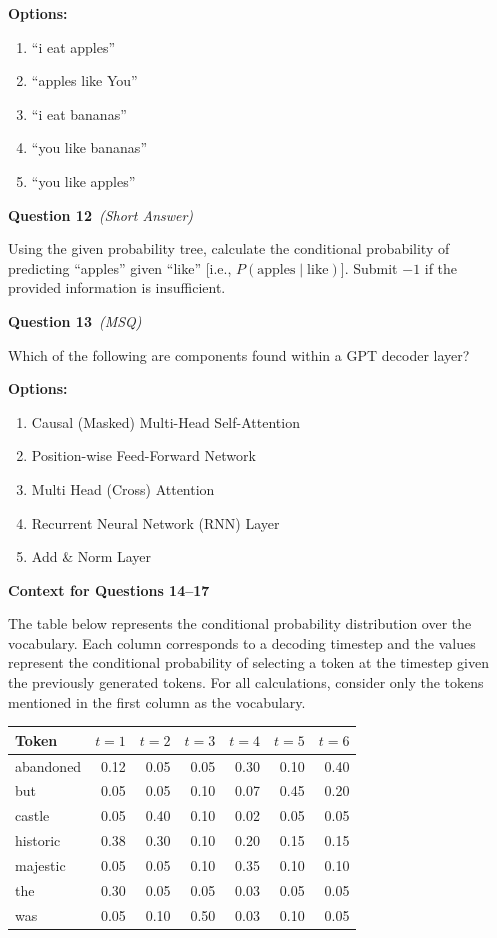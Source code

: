 \documentclass[11pt]{article}
\newcommand{\q}[2]{\vspace{0.5em}\noindent\textbf{Question #1}\if\relax\detokenize{#2}\relax\else\ \textit{(#2)}\fi\par}
\newcommand{\opts}{\textbf{Options:}}
\newcommand{\contexthead}[1]{\vspace{0.6em}\noindent\textbf{Context for Questions #1}\par}
\begin{document}
\opts
\begin{enumerate}[label=(\alph*)]
\item ``i eat apples''
\item ``apples like You''
\item ``i eat bananas''
\item ``you like bananas''
\item ``you like apples''
\end{enumerate}

\q{12}{Short Answer}
Using the given probability tree, calculate the conditional probability of predicting ``apples'' given ``like'' [i.e., $P(\text{apples}\mid\text{like})$]. Submit $-1$ if the provided information is insufficient.

\q{13}{MSQ}
Which of the following are components found within a GPT decoder layer?

\opts
\begin{enumerate}[label=(\alph*)]
\item Causal (Masked) Multi-Head Self-Attention
\item Position-wise Feed-Forward Network
\item Multi Head (Cross) Attention
\item Recurrent Neural Network (RNN) Layer
\item Add \& Norm Layer
\end{enumerate}

\contexthead{14--17}
The table below represents the conditional probability distribution over the vocabulary. Each column corresponds to a decoding timestep and the values represent the conditional probability of selecting a token at the timestep given the previously generated tokens. For all calculations, consider only the tokens mentioned in the first column as the vocabulary.

\begin{center}
\small
\begin{tabular}{lrrrrrr}
\toprule
Token & $t=1$ & $t=2$ & $t=3$ & $t=4$ & $t=5$ & $t=6$\\
\midrule
abandoned & 0.12 & 0.05 & 0.05 & 0.30 & 0.10 & 0.40\\
but       & 0.05 & 0.05 & 0.10 & 0.07 & 0.45 & 0.20\\
castle    & 0.05 & 0.40 & 0.10 & 0.02 & 0.05 & 0.05\\
historic  & 0.38 & 0.30 & 0.10 & 0.20 & 0.15 & 0.15\\
majestic  & 0.05 & 0.05 & 0.10 & 0.35 & 0.10 & 0.10\\
the       & 0.30 & 0.05 & 0.05 & 0.03 & 0.05 & 0.05\\
was       & 0.05 & 0.10 & 0.50 & 0.03 & 0.10 & 0.05\\
\bottomrule
\end{tabular}
\end{center}
\end{document}
